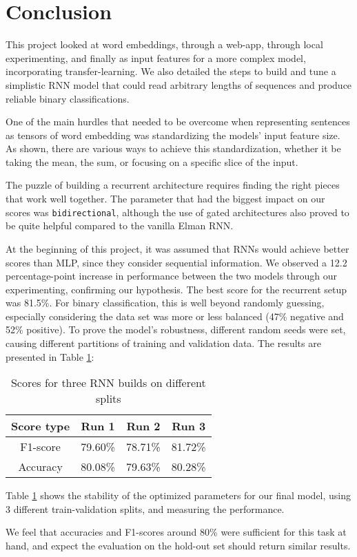 \section{Conclusion}
\label{chap:Conclusion}

\quad This project looked at word embeddings, through a web-app, through local experimenting, and finally as input features for a more complex model, incorporating transfer-learning. We also detailed the steps to build and tune a simplistic RNN model that could read arbitrary lengths of sequences and produce reliable binary classifications. 

One of the main hurdles that needed to be overcome when representing sentences as tensors of word embedding was standardizing the models' input feature size. As shown, there are various ways to achieve this standardization, whether it be taking the mean, the sum, or focusing on a specific slice of the input.

The puzzle of building a recurrent architecture requires finding the right pieces that work well together. The parameter that had the biggest impact on our scores was \texttt{bidirectional}, although the use of gated architectures also proved to be quite helpful compared to the vanilla Elman RNN. 

At the beginning of this project, it was assumed that RNNs would achieve better scores than MLP, since they consider sequential information. We observed a 12.2 percentage-point increase in performance between the two models through our experimenting, confirming our hypothesis. The best score for the recurrent setup was 81.5\%. For binary classification, this is well beyond randomly guessing, especially considering the data set was more or less balanced (47\% negative and 52\% positive). To prove the model's robustness, different random seeds were set, causing different partitions of training and validation data. The results are presented in Table \ref{tab:3runs}:

\begin{table}[H]
    \centering
    \begin{tabular}{c|c|c|c}
        Score type & \textbf{Run 1}   &  \textbf{Run 2}    &  \textbf{Run 3}  \\
        \hline
        F1-score   & 79.60\% & 78.71\% & 81.72\%\\ %
        Accuracy   & 80.08\% & 79.63\% & 80.28\%\\
    \end{tabular}
    \caption{Scores for three RNN builds on different splits}
    \label{tab:3runs}
\end{table}

Table \ref{tab:3runs} shows the  stability of the optimized parameters for our final model, using 3 different train-validation splits, and measuring the performance. 

We feel that accuracies and F1-scores around 80\% were sufficient for this task at hand, and expect the evaluation on the hold-out set should return similar results. 


